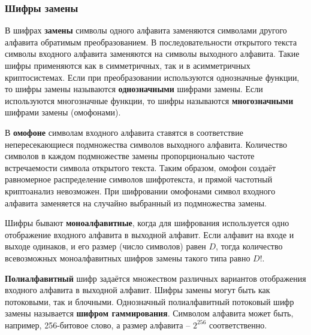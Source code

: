 \subsubsection{Шифры замены}

В шифрах \textbf{замены} символы одного алфавита заменяются символами другого алфавита обратимым преобразованием. В последовательности открытого текста символы входного алфавита заменяются на символы выходного алфавита. Такие шифры применяются как в симметричных, так и в асимметричных криптосистемах. Если при преобразовании используются однозначные функции, то шифры замены называются \textbf{однозначными} шифрами замены. Если используются многозначные функции, то шифры называются \textbf{многозначными} шифрами замены (омофонами).

В \textbf{омофоне} символам входного алфавита ставятся в соответствие непересекающиеся подмножества символов выходного алфавита. Количество символов в каждом подмножестве замены пропорционально частоте встречаемости символа открытого текста. Таким образом, омофон создаёт равномерное распределение символов шифротекста, и прямой частотный криптоанализ невозможен. При шифровании омофонами символ входного алфавита заменяется на случайно выбранный из подмножества замены.

Шифры бывают \textbf{моноалфавитные}, когда для шифрования используется одно отображение входного алфавита в выходной алфавит. Если алфавит на входе и выходе одинаков, и его размер (число символов) равен $D$, тогда количество всевозможных моноалфавитных шифров замены такого типа равно $D!$.

\textbf{Полиалфавитный} шифр задаётся множеством различных вариантов отображения входного алфавита в выходной алфавит. Шифры замены могут быть как потоковыми, так и блочными. Однозначный полиалфавитный потоковый шифр замены называется \textbf{шифром гаммирования}. Символом алфавита может быть, например, 256-битовое слово, а размер алфавита -- $2^{256}$ соответственно.
